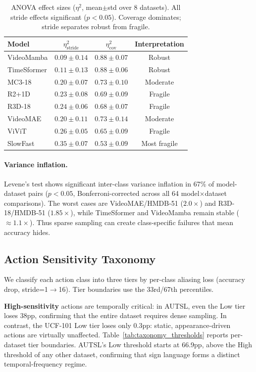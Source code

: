 \documentclass[runningheads]{llncs}
\newcommand{\tabtight}{\setlength{\tabcolsep}{3.5pt}\renewcommand{\arraystretch}{1.10}}
\begin{document}
\begin{table}[t]
\centering
\caption{ANOVA effect sizes ($\eta^2$, mean$\pm$std over 8 datasets). All stride effects significant ($p{<}0.05$). Coverage dominates; stride separates robust from fragile.}
\label{tab:anova}
\scriptsize\tabtight
\begin{tabular}{l cc c}
\toprule
Model & $\eta^2_\text{stride}$ & $\eta^2_\text{cov}$ & Interpretation \\
\midrule
VideoMamba     & $0.09 \pm 0.14$ & $0.88 \pm 0.07$ & Robust \\
TimeSformer    & $0.11 \pm 0.13$ & $0.88 \pm 0.06$ & Robust \\
MC3-18         & $0.20 \pm 0.07$ & $0.73 \pm 0.10$ & Moderate \\
R2+1D          & $0.23 \pm 0.08$ & $0.69 \pm 0.09$ & Fragile \\
R3D-18         & $0.24 \pm 0.06$ & $0.68 \pm 0.07$ & Fragile \\
VideoMAE       & $0.20 \pm 0.11$ & $0.73 \pm 0.14$ & Moderate \\
ViViT          & $0.26 \pm 0.05$ & $0.65 \pm 0.09$ & Fragile \\
SlowFast       & $0.35 \pm 0.07$ & $0.53 \pm 0.09$ & Most fragile \\
\bottomrule
\end{tabular}
\end{table}

\paragraph{Variance inflation.}
Levene's test shows significant inter-class variance inflation in 67\% of model-dataset pairs ($p<0.05$, Bonferroni-corrected across all 64 model$\times$dataset comparisons). The worst cases are VideoMAE/HMDB-51 ($2.0\times$) and R3D-18/HMDB-51 ($1.85\times$), while TimeSformer and VideoMamba remain stable ($\approx1.1\times$). Thus sparse sampling can create class-specific failures that mean accuracy hides.

\subsection{Action Sensitivity Taxonomy}
\label{sec:taxonomy}

We classify each action class into three tiers by per-class aliasing loss (accuracy drop, stride=1$\to$16). Tier boundaries use the 33rd/67th percentiles.

\textbf{High-sensitivity} actions are temporally critical: in AUTSL, even the Low tier loses 38pp, confirming that the entire dataset requires dense sampling. In contrast, the UCF-101 Low tier loses only 0.3pp: static, appearance-driven actions are virtually unaffected. Table~\ref{tab:taxonomy_thresholds} reports per-dataset tier boundaries. AUTSL's Low threshold starts at 66.9pp, above the High threshold of any other dataset, confirming that sign language forms a distinct temporal-frequency regime.
\end{document}
